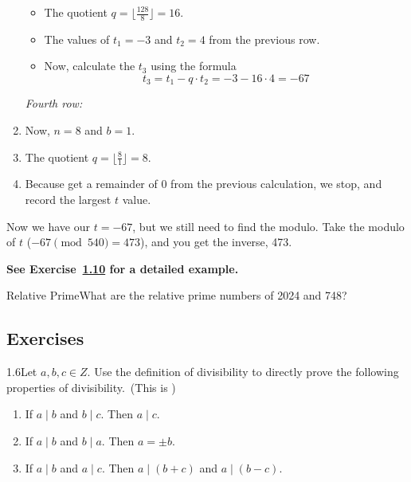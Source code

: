 \begin{enumerate}[label=\arabic*.]
\begin{itemize}
              \item The quotient \(q = \lfloor \frac{128}{8} \rfloor = 16\).
              \item The values of \(t_1 = -3\) and \(t_2 = 4\) from the previous row.
              \item Now, calculate the \(t_3\) using the formula
                    \[
                        t_3 = t_1 - q \cdot t_2 = -3 - 16 \cdot 4 = -67
                    \]
          \end{itemize}
          \textit{Fourth row:}
    \item Now, \(n = 8\) and \(b = 1\).
    \item The quotient \(q = \lfloor \frac{8}{1} \rfloor = 8\).
    \item Because get a remainder of 0 from the previous calculation, we stop, and record the largest \(t\) value.
\end{enumerate}
Now we have our \(t = -67\), but we still need to find the modulo. Take the modulo of \(t\) (\(-67 \pmod{540} = 473\)), and you get the inverse, 473.

\textbf{See Exercise~\hyperref[exerc:1.10]{1.10} for a detailed example.}

\begin{example}
    {Relative Prime}What are the relative prime numbers of 2024 and 748?
\end{example}


\renewcommand{\theenumi}{\alph{enumi}}
\renewcommand{\labelenumi}{(\theenumi)}
\subsection{Exercises}
\begin{exercise}
    {1.6}Let \(a, b, c \in Z\). Use the definition of divisibility to directly prove the following properties of divisibility.\ (This is )
    \begin{enumerate}
        \item If \(a \mid b\) and \(b \mid c\). Then \(a \mid c\).
        \item If \(a \mid b\) and \(b \mid a\). Then \(a = \pm b\).
        \item If \(a \mid b\) and \(a \mid c\). Then \(a \mid (b + c)\) and \(a \mid (b - c)\).
    \end{enumerate}
\end{exercise}


